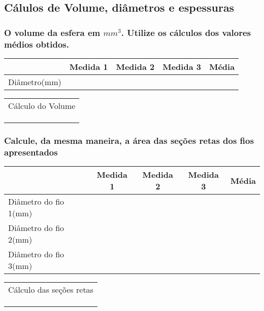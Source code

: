 \documentclass[10pt,a4paper,onecolumn,notitlepage]{scrartcl}
\begin{document}
\subsection{Cálulos de Volume, diâmetros e espessuras}
\subsubsection{O volume da esfera em $mm^3$. Utilize os cálculos dos valores médios obtidos.} 
\begin{table}[H]
\centering
\begin{tabular}{|l|*{4}{c|}}
\hline & Medida 1& Medida 2& Medida 3& Média \\
\hline Diâmetro(mm)& & &  & \\ 
\hline
\end{tabular}
\end{table}

\begin{table}[H]
\centering
\begin{tabular}{|p{10cm}|}
\hline Cálculo do Volume \\ 
\\
\\
\\
\hline
\end{tabular}
\end{table}

\subsubsection{Calcule,  da  mesma  maneira,  a  área  das  seções  retas  dos  fios  apresentados}
\begin{table}[H]
\centering
\begin{tabular}{|l|*{4}{c|}}
\hline & Medida 1& Medida 2& Medida 3& Média \\
\hline Diâmetro do fio 1(mm)& & &  & \\ 
\hline Diâmetro do fio 2(mm)& & &  & \\ 
\hline Diâmetro do fio 3(mm)& & &  & \\ 
\hline
\end{tabular}
\end{table}

\begin{table}[H]
\centering
\begin{tabular}{|p{10cm}|}
\hline Cálculo das seções retas \\ 
\\
\\
\\
\hline
\end{tabular}
\end{table}
\end{document}
